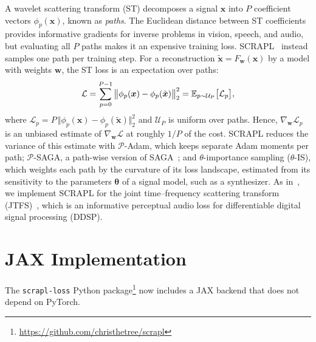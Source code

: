 \documentclass{article}
\begin{document}
\begin{sloppy}
A wavelet scattering transform (ST) decomposes a signal $\boldsymbol{x}$ into $P$ coefficient vectors $\phi_p(\boldsymbol{x})$, known as \emph{paths}.
The Euclidean distance between ST coefficients provides informative gradients for inverse problems in vision, speech, and audio, but evaluating all $P$ paths makes it an expensive training loss.
SCRAPL~\cite{mitcheltree2026scrapl} instead samples one path per training step.
For a reconstruction $\tilde{\boldsymbol{x}} = F_{\boldsymbol{w}}(\boldsymbol{x})$ by a model with weights $\boldsymbol{w}$, the ST loss is an expectation over paths:
\vspace{-5pt}
\begin{equation}
\mathcal{L} = \sum_{p=0}^{P-1}
  \big\Vert \phi_p(\boldsymbol{x}) - \phi_p(\tilde{\boldsymbol{x}}) \big\Vert_2^2
  = \mathbb{E}_{p\sim\mathcal{U}_P}\big[\mathcal{L}_p\big],
\label{eq:scrapl}
\vspace{-5pt}
\end{equation}
where $\mathcal{L}_p = P\,\Vert \phi_p(\boldsymbol{x}) - \phi_p(\tilde{\boldsymbol{x}}) \Vert_2^2$ and $\mathcal{U}_P$ is uniform over paths.
Hence, $\nabla_{\boldsymbol{w}}\mathcal{L}_p$ is an unbiased estimate of $\nabla_{\boldsymbol{w}}\mathcal{L}$ at roughly $1/P$ of the cost.
SCRAPL reduces the variance of this estimate with $\mathcal{P}$-Adam, which keeps separate Adam moments per path; $\mathcal{P}$-SAGA, a path-wise version of SAGA~\cite{defazio2014saga}; and $\theta$-importance sampling ($\theta$-IS), which weights each path by the curvature of its loss landscape, estimated from its sensitivity to the parameters $\boldsymbol{\theta}$ of a signal model, such as a synthesizer.
As in~\cite{mitcheltree2026scrapl}, we implement SCRAPL for the joint time--frequency scattering transform (JTFS)~\cite{anden2019joint},
which is an informative perceptual audio loss for differentiable digital signal processing (DDSP).

\vspace{-8pt}
\section{JAX Implementation}
\label{sec:jax}
\vspace{-5pt}

The \texttt{scrapl-loss} Python package\footnote{\url{https://github.com/christhetree/scrapl}} now includes a JAX backend that does not depend on PyTorch.


\end{sloppy}
\end{document}
